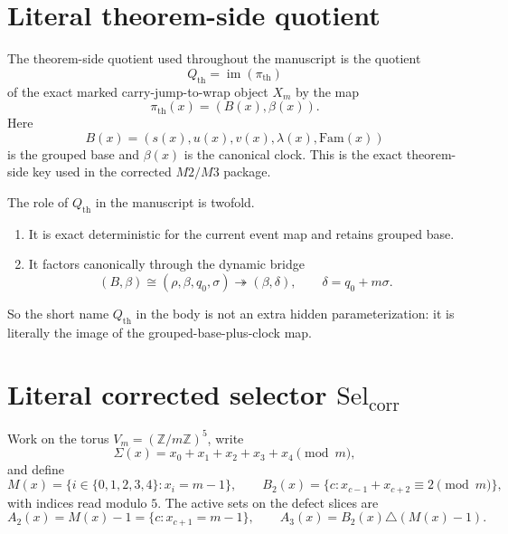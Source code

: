 \documentclass[11pt]{article}
\newcommand{\Z}{\mathbb Z}
\newcommand{\SelCorr}{\mathrm{Sel}_{\mathrm{corr}}}
\begin{document}
\appendix

\section{Literal theorem-side quotient}
\label{app:qth}

The theorem-side quotient used throughout the manuscript is the quotient
\[
Q_{\mathrm{th}}=\operatorname{im}(\pi_{\mathrm{th}})
\]
of the exact marked carry-jump-to-wrap object \(X_m\) by the map
\[
\pi_{\mathrm{th}}(x)=(B(x),\beta(x)).
\]
Here
\[
B(x)=(s(x),u(x),v(x),\lambda(x),\mathrm{Fam}(x))
\]
is the grouped base and \(\beta(x)\) is the canonical clock.
This is the exact theorem-side key used in the corrected \(M2/M3\) package.

The role of \(Q_{\mathrm{th}}\) in the manuscript is twofold.
\begin{enumerate}[label=\textup{(\arabic*)},leftmargin=2.8em]
\item It is exact deterministic for the current event map and retains grouped
      base.
\item It factors canonically through the dynamic bridge
      \[
      (B,\beta)\cong(\rho,\beta,q_0,\sigma)\twoheadrightarrow(\beta,\delta),
      \qquad
      \delta=q_0+m\sigma.
      \]
\end{enumerate}
So the short name \(Q_{\mathrm{th}}\) in the body is not an extra hidden
parameterization: it is literally the image of the grouped-base-plus-clock map.

\section{Literal corrected selector \texorpdfstring{\(\SelCorr\)}{SelCorr}}
\label{app:selcorr}

Work on the torus \(V_m=(\Z/m\Z)^5\), write
\[
\Sigma(x)=x_0+x_1+x_2+x_3+x_4\pmod m,
\]
and define
\[
M(x)=\{i\in\{0,1,2,3,4\}:x_i=m-1\},
\qquad
B_2(x)=\{c:x_{c-1}+x_{c+2}\equiv 2\pmod m\},
\]
with indices read modulo \(5\).
The active sets on the defect slices are
\[
A_2(x)=M(x)-1=\{c:x_{c+1}=m-1\},
\qquad
A_3(x)=B_2(x)\triangle(M(x)-1).
\]
\end{document}
